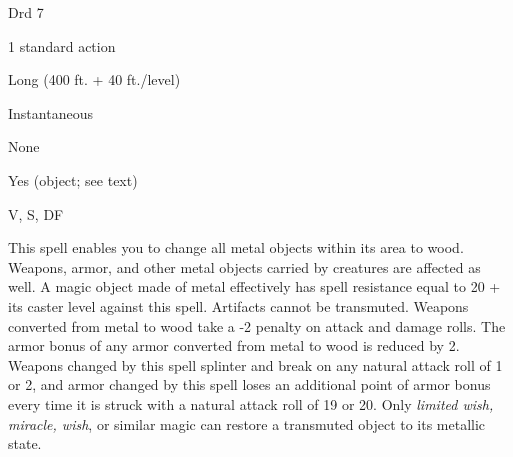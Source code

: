
\begin{description*}
\item[Level:] Drd 7
\item[Casting Time:] 1 standard action
\item[Range:] Long (400 ft. + 40 ft./level)
\item[Duration:] Instantaneous
\item[Saving Throw:] None
\item[Spell Resistance:] Yes (object; see text)
\item[Components:] V, S, DF
\end{description*}

This spell enables you to change all metal objects within its area to wood. Weapons,
armor, and other metal objects carried by creatures are affected as well. A magic
object made of metal effectively has spell resistance equal to 20 + its caster
level against this spell. Artifacts cannot be transmuted. Weapons converted from
metal to wood take a -2 penalty on attack and damage rolls. The armor bonus of
any armor converted from metal to wood is reduced by 2. Weapons changed by this
spell splinter and break on any natural attack roll of 1 or 2, and armor changed
by this spell loses an additional point of armor bonus every time it is struck
with a natural attack roll of 19 or 20.
Only \textit{limited wish, miracle, wish}, or similar magic can restore a transmuted
object to its metallic state.